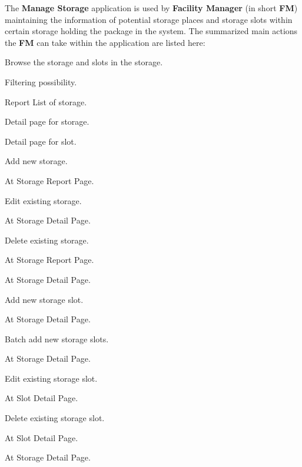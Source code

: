 The \textbf{Manage Storage} application is used by \textbf{Facility Manager} (in short \textbf{FM}) maintaining the information of potential storage places and storage slots within certain storage holding the package in the system.  
The summarized main actions the \textbf{FM} can take within the application are listed here:

\begin{compactenum}
	\item Browse the storage and slots in the storage.
        \begin{compactenum}
            \item Filtering possibility.
            \item Report List of storage.
            \item Detail page for storage.
            \item Detail page for slot.
        \end{compactenum}
    \item Add new storage.
        \begin{compactenum}
            \item At Storage Report Page.
        \end{compactenum}
    \item Edit existing storage.
        \begin{compactenum}
            \item At Storage Detail Page.
        \end{compactenum}
    \item Delete existing storage.
        \begin{compactenum}
            \item At Storage Report Page.
            \item At Storage Detail Page.
        \end{compactenum}
    \item Add new storage slot.
        \begin{compactenum}
            \item At Storage Detail Page.
        \end{compactenum}
    \item Batch add new storage slots.
        \begin{compactenum}
            \item At Storage Detail Page.
        \end{compactenum}
    \item Edit existing storage slot.
        \begin{compactenum}
            \item At Slot Detail Page.
        \end{compactenum}
    \item Delete existing storage slot.
        \begin{compactenum}
            \item At Slot Detail Page.
            \item At Storage Detail Page.
        \end{compactenum}
\end{compactenum}

